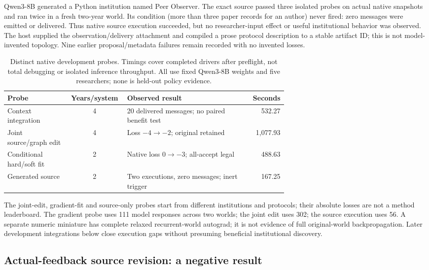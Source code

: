 Qwen3-8B generated a Python  institution named Peer
Observer. The exact source passed three isolated probes on actual native
snapshots and ran twice in a fresh two-year world. Its condition (more than
three paper records for an author) never fired: zero messages were emitted or
delivered. Thus native source execution succeeded, but no researcher-input
effect or useful institutional behavior was observed. The host supplied the
observation/delivery attachment and compiled a prose protocol description to
a stable artifact ID; this is not model-invented topology. Nine earlier
proposal/metadata failures remain recorded with no invented losses.

\begin{table}[ht]
\caption{Distinct native development probes. Timings cover completed drivers
after preflight, not total debugging or isolated inference throughput. All use
fixed Qwen3-8B weights and five researchers; none is held-out policy evidence.}
\label{tab:native-probes}
\centering\small
\begin{tabular}{p{0.22\linewidth}cp{0.44\linewidth}r}
\toprule
Probe & Years/system & Observed result & Seconds \\
\midrule
Context integration & 4 & 20 delivered messages; no paired benefit test & 532.27 \\
Joint source/graph edit & 4 & Loss $-4\to-2$; original retained & 1,077.93 \\
Conditional hard/soft fit & 2 & Native loss $0\to-3$; all-accept legal & 488.63 \\
Generated source & 2 & Two executions, zero messages; inert trigger & 167.25 \\
\bottomrule
\end{tabular}
\end{table}

The joint-edit, gradient-fit and source-only probes start from different
institutions and protocols; their absolute losses are not a method leaderboard.
The gradient probe uses 111 model responses across two worlds; the joint edit
uses 302; the source execution uses 56. A separate numeric miniature has
complete relaxed recurrent-world autograd; it is not evidence of full
original-world backpropagation. Later development integrations below close
execution gaps without presuming beneficial institutional discovery.

\subsection{Actual-feedback source revision: a negative result}

